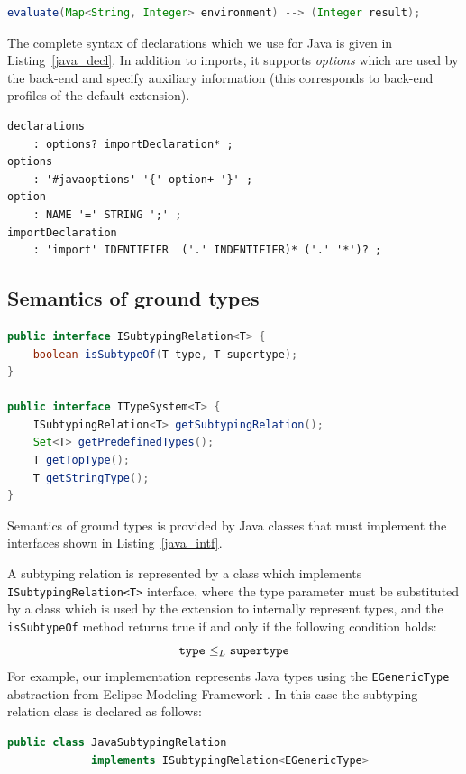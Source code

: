 \documentclass{llncs2e/llncs}
\newcommand{\lstref}[1]{Listing~\ref{#1}}
\begin{document}
{\begin{lstlisting}[language=Java]
evaluate(Map<String, Integer> environment) --> (Integer result);
\end{lstlisting}
 
The complete syntax of declarations which we use for Java is given in \lstref{java_decl}. In addition to imports, it supports \emph{options} which are used by the back-end and specify auxiliary information (this corresponds to back-end profiles of the default extension).
\begin{lstlisting}[caption=Declaration syntax for Java 5,label=java_decl,float]
declarations
	: options? importDeclaration* ;
options
	: '#javaoptions' '{' option+ '}' ;
option
	: NAME '=' STRING ';' ;
importDeclaration
	: 'import' IDENTIFIER  ('.' INDENTIFIER)* ('.' '*')? ;
\end{lstlisting}

\subsection{Semantics of ground types}

\begin{lstlisting}[language=Java,caption=Java interfaces describing semantics of ground types,label=java_intf,float]
public interface ISubtypingRelation<T> {
	boolean isSubtypeOf(T type, T supertype);
}

public interface ITypeSystem<T> {
	ISubtypingRelation<T> getSubtypingRelation();
	Set<T> getPredefinedTypes();
	T getTopType();
	T getStringType();
}
\end{lstlisting}

Semantics of ground types is provided by Java classes that must implement the interfaces shown in \lstref{java_intf}.

A subtyping relation is represented by a class which implements \texttt{ISubtypingRelation<T>} interface, where the type parameter must be substituted by a class which is used by the extension to internally represent types, and the \texttt{isSubtypeOf} method returns true if and only if the following condition holds:
$$\mathtt{type} \le_L \mathtt{supertype}$$
For example, our implementation represents Java types using the \texttt{EGenericType} abstraction from Eclipse Modeling Framework \cite{EMF}. In this case the subtyping relation class is declared as follows:
\begin{lstlisting}[language=Java]
public class JavaSubtypingRelation 
		 	 implements ISubtypingRelation<EGenericType>
\end{lstlisting}

}
\end{document}
